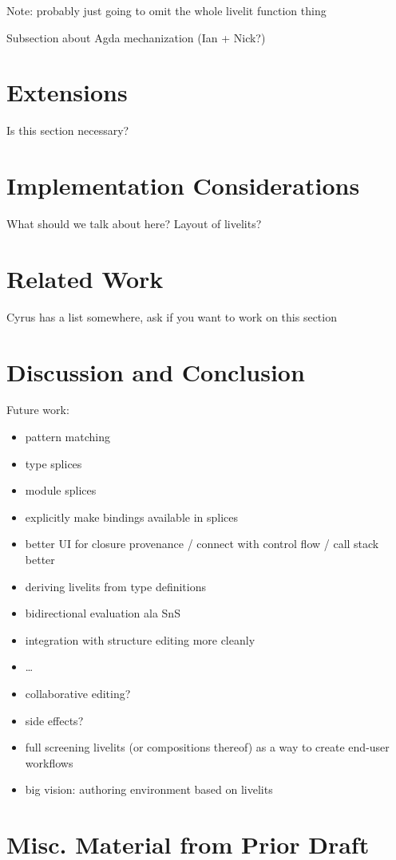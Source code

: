 Note: probably just going to omit the whole livelit function thing

Subsection about Agda mechanization (Ian + Nick?)

\section{Extensions}
Is this section necessary?

\section{Implementation Considerations}
What should we talk about here? Layout of livelits? 

\section{Related Work}
Cyrus has a list somewhere, ask if you want to work on this section

\section{Discussion and Conclusion}
Future work:
\begin{itemize}
  \item pattern matching
  \item type splices
  \item module splices
  \item explicitly make bindings available in splices
  \item better UI for closure provenance / connect with control flow / call stack better
  \item deriving livelits from type definitions
  \item bidirectional evaluation ala SnS
  \item integration with structure editing more cleanly
  \item \dots
  \item collaborative editing?
  \item side effects?
  \item full screening livelits (or compositions thereof) as a way to create end-user workflows
  \item big vision: authoring environment based on livelits
\end{itemize}
\clearpage
\appendix
\section{Misc. Material from Prior Draft}

